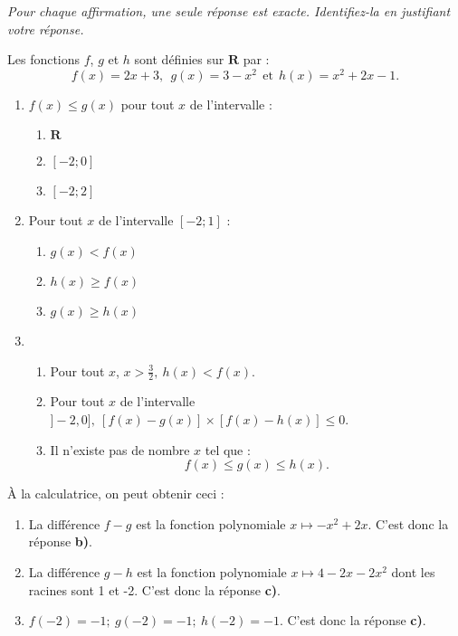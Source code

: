 \documentclass[a4paper,12pt,french]{article}
\newcommand{\R}{\mathbf{R}}
\begin{document}
\begin{Exercise}[title={QCM}]
  \emph{Pour chaque affirmation, une seule réponse est exacte.
  Identifiez-la en justifiant votre réponse.}

  Les fonctions $f$, $g$ et $h$ sont définies sur $\R$ par : \[ f(x) =
  2x+3 ,\ \ g(x) = 3 - x^2\ \ \text{et}\ \ h(x) = x^2 + 2x - 1 .\]
  \begin{enumerate}
    \item $f(x) \leqslant g(x)$ pour tout $x$ de l'intervalle :
      \begin{multicols}{3}
        \begin{enumerate}
          \item $\R$
          \item $[-2;0]$
          \item $[-2;2]$
        \end{enumerate}
      \end{multicols}
    \item Pour tout $x$ de l'intervalle $[-2;1]$ :
      \begin{multicols}{3}
        \begin{enumerate}
          \item $g(x) < f(x)$
          \item $h(x) \geqslant f(x)$
          \item $g(x) \geqslant h(x)$
        \end{enumerate}
      \end{multicols}
    \item \begin{enumerate}
        \item Pour tout $x$, $x > \frac32,\ h(x) < f(x)$.
        \item Pour tout $x$ de l'intervalle $]-2,0],\  \left[f(x) -
          g(x)\right]\times\left[f(x) - h(x)\right] \leqslant 0$.
        \item Il n'existe pas de nombre $x$ tel que : \[f(x) \leqslant
          g(x) \leqslant h(x).\]
      \end{enumerate}
  \end{enumerate}
\end{Exercise}
\begin{Answer}
  À la calculatrice, on peut obtenir ceci :
  \begin{center}
  \end{center}
  \begin{enumerate}
    \item La différence $f-g$ est la fonction polynomiale $x\mapsto -x^2
      + 2x$. C'est donc la réponse \textbf{b)}.
    \item La différence $g -h$ est la fonction polynomiale $x\mapsto 4 -
      2x -2x^2$ dont les racines sont 1 et -2. C'est donc la réponse
      \textbf{c)}.
    \item $f(-2) = -1 ;\ g(-2) = -1 ;\ h(-2) = -1$. C'est donc la
      réponse \textbf{c)}.
  \end{enumerate}
\end{Answer}
\end{document}
